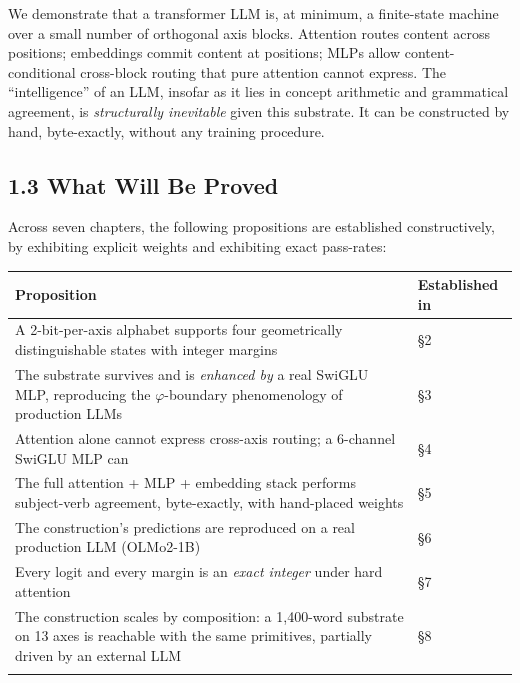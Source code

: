 \documentclass[
  twocolumn,
  10pt,
  a4paper]{article}
\newenvironment{tsxtable}{\begin{center}\footnotesize}{\end{center}}
\let\endhead\relax
\begin{document}
We demonstrate that a transformer LLM is, at minimum, a finite-state
machine over a small number of orthogonal axis blocks. Attention routes
content across positions; embeddings commit content at positions; MLPs
allow content-conditional cross-block routing that pure attention cannot
express. The ``intelligence'' of an LLM, insofar as it lies in concept
arithmetic and grammatical agreement, is \emph{structurally inevitable}
given this substrate. It can be constructed by hand, byte-exactly,
without any training procedure.

\hypertarget{what-will-be-proved}{%
\subsection{1.3 What Will Be Proved}\label{what-will-be-proved}}

Across seven chapters, the following propositions are established
constructively, by exhibiting explicit weights and exhibiting exact
pass-rates:

\begin{tsxtable}\begin{tabularx}{\linewidth}{@{}
  >{\raggedright\arraybackslash}p{}
  >{\raggedright\arraybackslash}p{}@{}}
\toprule\noalign{}
\begin{minipage}[b]{\linewidth}\raggedright
Proposition
\end{minipage} & \begin{minipage}[b]{\linewidth}\raggedright
Established in
\end{minipage} \\
\midrule\noalign{}
\endhead
A 2-bit-per-axis alphabet supports four geometrically distinguishable
states with integer margins & §2 \\
The substrate survives and is \emph{enhanced by} a real SwiGLU MLP,
reproducing the \(\varphi\)-boundary phenomenology of production LLMs &
§3 \\
Attention alone cannot express cross-axis routing; a 6-channel SwiGLU
MLP can & §4 \\
The full attention + MLP + embedding stack performs subject-verb
agreement, byte-exactly, with hand-placed weights & §5 \\
The construction's predictions are reproduced on a real production LLM
(OLMo2-1B) & §6 \\
Every logit and every margin is an \emph{exact integer} under hard
attention & §7 \\
The construction scales by composition: a 1,400-word substrate on 13
axes is reachable with the same primitives, partially driven by an
external LLM & §8 \\
\bottomrule\noalign{}
\end{tabularx}\end{tsxtable}
\end{document}
